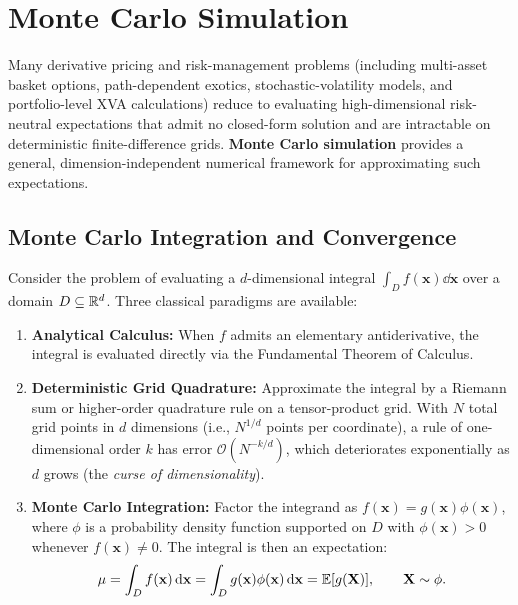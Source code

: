\chapter{Monte Carlo Simulation}\label{ch:monte-carlo}

Many derivative pricing and risk-management problems (including multi-asset basket options, path-dependent exotics, stochastic-volatility models, and portfolio-level XVA calculations) reduce to evaluating high-dimensional risk-neutral expectations that admit no closed-form solution and are intractable on deterministic finite-difference grids. \textbf{Monte Carlo simulation} provides a general, dimension-independent numerical framework for approximating such expectations.

\section{Monte Carlo Integration and Convergence}

Consider the problem of evaluating a $d$-dimensional integral $\int_D f(\mathbf{x})\dd\mathbf{x}$ over a domain $D \subseteq \mathbb{R}^d$. Three classical paradigms are available:
\begin{enumerate}
    \item \textbf{Analytical Calculus:} When $f$ admits an elementary antiderivative, the integral is evaluated directly via the Fundamental Theorem of Calculus.
    \item \textbf{Deterministic Grid Quadrature:} Approximate the integral by a Riemann sum or higher-order quadrature rule on a tensor-product grid. With $N$ total grid points in $d$ dimensions (i.e., $N^{1/d}$ points per coordinate), a rule of one-dimensional order $k$ has error $\mathcal{O}(N^{-k/d})$, which deteriorates exponentially as $d$ grows (the \emph{curse of dimensionality}).
    \item \textbf{Monte Carlo Integration:} Factor the integrand as $f(\mathbf{x}) = g(\mathbf{x})\phi(\mathbf{x})$, where $\phi$ is a probability density function supported on $D$ with $\phi(\mathbf{x}) > 0$ whenever $f(\mathbf{x}) \neq 0$. The integral is then an expectation:
    \[
    \mu = \int_D f(\mathbf{x})\,\mathrm{d}\mathbf{x} = \int_D g(\mathbf{x})\phi(\mathbf{x})\,\mathrm{d}\mathbf{x} = \mathbb{E}[g(\mathbf{X})], \qquad \mathbf{X} \sim \phi.
    \]
\end{enumerate}

